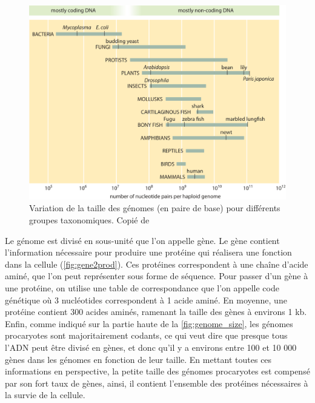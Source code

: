 \begin{figure}[htbp]
    \centering
    \includegraphics[width=\linewidth]{images/genome_size.png}
    \caption[Tailles des génomes pour différents groupes taxonomiques]{Variation de la taille des génomes (en paire de base) pour différents groupes taxonomiques. Copié de \cite{milo_cell_2015}}
    \label{fig:genome_size}
\end{figure}

Le génome est divisé en sous-unité que l'on appelle gène. Le gène contient l'information nécessaire pour produire une protéine qui réalisera une fonction dans la cellule (\autoref{fig:gene2prod}). Ces protéines correspondent à une chaîne d'acide aminé, que l'on peut représenter sous forme de séquence. Pour passer d'un gène à une protéine, on utilise une table de correspondance que l'on appelle code génétique où 3 nucléotides correspondent à 1 acide aminé. En moyenne, une protéine contient 300 acides aminés, ramenant la taille des gènes à environs 1 kb. Enfin, comme indiqué sur la partie haute de la \autoref{fig:genome_size}, les génomes procaryotes sont majoritairement codants, ce qui veut dire que presque tous l'ADN peut être divisé en gènes, et donc qu'il y a environs entre 100 et 10 000 gènes dans les génomes en fonction de leur taille. En mettant toutes ces informations en perspective, la petite taille des génomes procaryotes est compensé par son fort taux de gènes, ainsi, il contient l'ensemble des protéines nécessaires à la survie de la cellule. 


